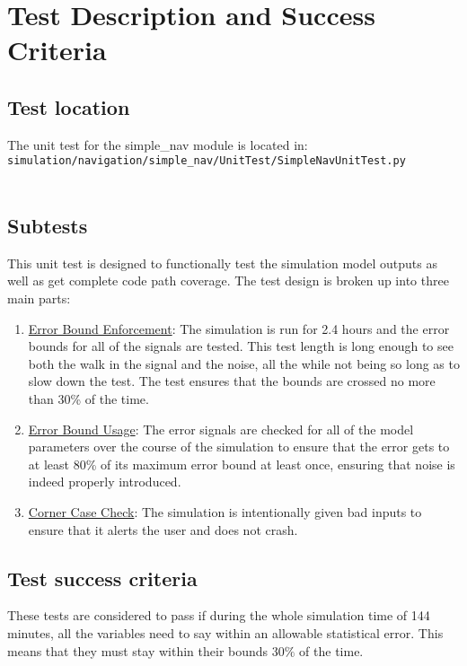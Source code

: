 \section{Test Description and Success Criteria}


\subsection{Test location}

The unit test for the simple\_nav module is located in:\\

\noindent
{\tt simulation/navigation/simple\_nav/UnitTest/SimpleNavUnitTest.py} \\
\\

\subsection{Subtests}

\noindent This unit test is designed to functionally test the simulation model 
outputs as well as get complete code path coverage.  The test design is broken 
up into three main parts:\\
\begin{enumerate}
\item{\underline{Error Bound Enforcement}: The simulation is run for 2.4 hours and the 
   error bounds for all of the signals are tested. This test length is long enough to see both
   the walk in the signal and the noise, all the while not being so long as to slow down the test.
   The test ensures that the bounds are crossed no more than 30\% of the time.}
\item{\underline{Error Bound Usage}: The error signals are checked for all of the model 
   parameters over the course of the simulation to ensure that the error gets 
   to at least 80\% of its maximum error bound at least once, ensuring that noise is indeed
   properly introduced.}
\item{\underline{Corner Case Check}: The simulation is intentionally given bad inputs to 
   ensure that it alerts the user and does not crash.}
\end{enumerate}

\subsection{Test success criteria}

These tests are considered to pass if during the whole simulation time of 144 minutes,
all the variables need to say within an allowable statistical error. This means that they
must stay within their bounds $30\%$ of the time.

